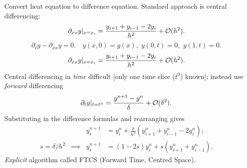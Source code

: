 \documentclass{beamer}
\begin{document}
\begin{frame}
\begin{overlayarea}{\textwidth}{0.8\textheight}
{      Convert heat equation to difference equation.
      Standard approach is central differencing:
      \begin{equation*}
        \partial_{x x} y |_{x = x_i} = \frac{ y_{i+1} + y_{i-1} - 2
          y_i}{h^2} + {\cal O}(h^2).
      \end{equation*}
    }
    {
      \begin{equation*}
        \partial_{t} y - \partial_{x x} y = 0. \quad y(x, 0) = g(x),
        \,\, y(0, t) = 0, \,\, y(1, t) = 0.
      \end{equation*}
      \begin{equation*}
        \partial_{x x} y |_{x = x_i} = \frac{ y_{i+1} + y_{i-1} - 2
          y_i}{h^2} + {\cal O}(h^2).
      \end{equation*}
      Central differencing in \emph{time} difficult [only one time
      slice ($t^0$) known]; instead use \emph{forward} differencing
      \begin{equation*}
        \partial_t y |_{t = t^n} = \frac{y^{n+1} - y^n}{\delta} + {\cal
          O}(\delta^2).
      \end{equation*}
    }
    {
      Substituting in the difference formulas and rearranging gives
      \begin{align*}
        && y_i^{n+1} & = y_i^n + \frac{\delta}{h^2} \left( y_{i+1}^n +
          y_{i-1}^n - 2 y_i^n \right); \\
        s = \delta / h^2 & \implies &
        y_i^{n+1} &= ( 1 - 2 s ) y_i^n + s \left( y_{i+1}^n +
          y_{i-1}^n \right).
      \end{align*}
    }
    {
      \emph{Explicit} algorithm called FTCS (Forward Time,
      Centred Space).
    }
  \end{overlayarea}

\end{frame}
\end{document}
